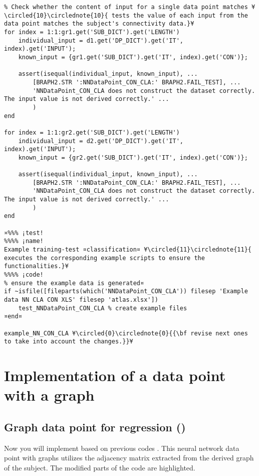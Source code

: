\documentclass{tufte-handout}
\begin{document}
\begin{lstlisting}
% Check whether the content of input for a single data point matches ¥\circled{10}\circlednote{10}{ tests the value of each input from the data point matches the subject's connectivity data.}¥
for index = 1:1:gr1.get('SUB_DICT').get('LENGTH')
    individual_input = d1.get('DP_DICT').get('IT', index).get('INPUT');
    known_input = {gr1.get('SUB_DICT').get('IT', index).get('CON')};

    assert(isequal(individual_input, known_input), ...
        [BRAPH2.STR ':NNDataPoint_CON_CLA:' BRAPH2.FAIL_TEST], ...
        'NNDataPoint_CON_CLA does not construct the dataset correctly. The input value is not derived correctly.' ...
        )
end

for index = 1:1:gr2.get('SUB_DICT').get('LENGTH')
    individual_input = d2.get('DP_DICT').get('IT', index).get('INPUT');
    known_input = {gr2.get('SUB_DICT').get('IT', index).get('CON')};

    assert(isequal(individual_input, known_input), ...
        [BRAPH2.STR ':NNDataPoint_CON_CLA:' BRAPH2.FAIL_TEST], ...
        'NNDataPoint_CON_CLA does not construct the dataset correctly. The input value is not derived correctly.' ...
        )
end

¤%%% ¡test! 
%%%% ¡name!
Example training-test ¤classification¤ ¥\circled{11}\circlednote{11}{ executes the corresponding example scripts to ensure the functionalities.}¥
%%%% ¡code!
% ensure the example data is generated¤
if ~isfile([fileparts(which('NNDataPoint_CON_CLA')) filesep 'Example data NN CLA CON XLS' filesep 'atlas.xlsx'])
    test_NNDataPoint_CON_CLA % create example files
¤end¤

example_NN_CON_CLA ¥\circled{0}\circlednote{0}{{\bf revise next ones to take into account the changes.}}¥
\end{lstlisting}

\clearpage

\section{Implementation of a data point with a graph}

\subsection{Graph data point for regression ()}

Now you will implement  based on previous codes .
This neural network data point with graphs utilizes the adjacency matrix extracted from the derived graph of the subject. 
The modified parts of the code are highlighted.
\end{document}
